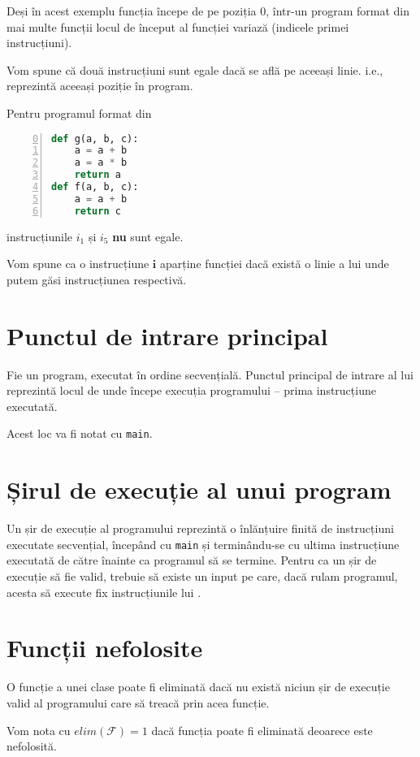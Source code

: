 Deși în acest exemplu funcția  începe de pe poziția 0,
într-un program format din mai multe funcții locul de început al
funcției variază (indicele primei instrucțiuni).

Vom spune că două instrucțiuni sunt egale dacă se află pe aceeași
linie. i.e., reprezintă aceeași poziție în program.

Pentru programul format din
\begin{lstlisting}[language=Python, numbers=left, firstnumber=0]
def g(a, b, c):
    a = a + b
    a = a * b
    return a
def f(a, b, c):
    a = a + b
    return c
\end{lstlisting}
instrucțiunile $i_1$ și $i_5$ \textbf{nu} sunt egale.

Vom spune ca o instrucțiune $\mathbf{i}$ aparține funcției
 dacă există o linie a lui  unde putem găsi
instrucțiunea respectivă.

\section{Punctul de intrare principal}

Fie  un program, executat în ordine secvențială.
Punctul principal de intrare al lui  reprezintă locul de
unde începe execuția programului -- prima instrucțiune executată.

Acest loc va fi notat cu \texttt{main}.

\section{Șirul de execuție al unui program}

Un șir de execuție  al programului  reprezintă o înlănțuire
finită de instrucțiuni executate secvențial, începând cu
\texttt{main} și terminându-se cu ultima instrucțiune executată de
către  înainte ca programul să se termine.
Pentru ca un șir de execuție  să fie valid, trebuie să
existe un input pe care, dacă rulam programul, acesta să
execute fix instrucțiunile lui .

\section{Funcții nefolosite}

O funcție a unei clase poate fi eliminată dacă nu există niciun
șir de execuție valid al programului care să treacă prin acea
funcție.

Vom nota cu $elim(\mathcal{F}) = 1$ dacă funcția  poate fi
eliminată deoarece este nefolosită.

